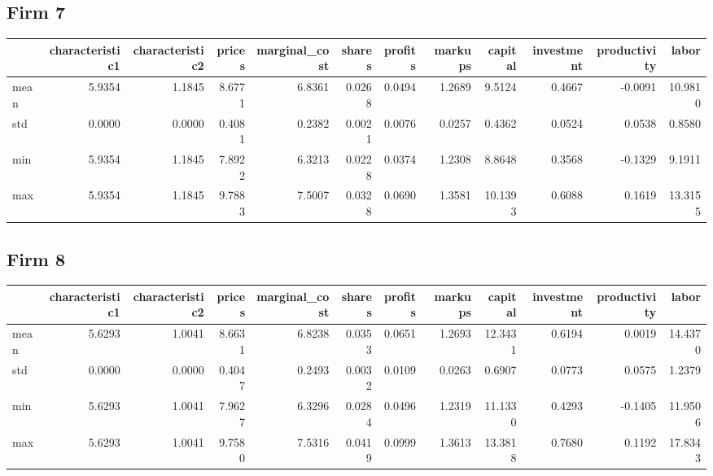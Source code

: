 \subsection*{Firm 7}
\begin{tabular}{lrrrrrrrrrrr}
\toprule
{} &  characteristic1 &  characteristic2 &  prices &  marginal\_cost &  shares &  profits &  markups &  capital &  investment &  productivity &   labor \\
\midrule
mean &           5.9354 &           1.1845 &  8.6771 &         6.8361 &  0.0268 &   0.0494 &   1.2689 &   9.5124 &      0.4667 &       -0.0091 & 10.9810 \\
std  &           0.0000 &           0.0000 &  0.4081 &         0.2382 &  0.0021 &   0.0076 &   0.0257 &   0.4362 &      0.0524 &        0.0538 &  0.8580 \\
min  &           5.9354 &           1.1845 &  7.8922 &         6.3213 &  0.0228 &   0.0374 &   1.2308 &   8.8648 &      0.3568 &       -0.1329 &  9.1911 \\
max  &           5.9354 &           1.1845 &  9.7883 &         7.5007 &  0.0328 &   0.0690 &   1.3581 &  10.1393 &      0.6088 &        0.1619 & 13.3155 \\
\bottomrule
\end{tabular}


\subsection*{Firm 8}
\begin{tabular}{lrrrrrrrrrrr}
\toprule
{} &  characteristic1 &  characteristic2 &  prices &  marginal\_cost &  shares &  profits &  markups &  capital &  investment &  productivity &   labor \\
\midrule
mean &           5.6293 &           1.0041 &  8.6631 &         6.8238 &  0.0353 &   0.0651 &   1.2693 &  12.3431 &      0.6194 &        0.0019 & 14.4370 \\
std  &           0.0000 &           0.0000 &  0.4047 &         0.2493 &  0.0032 &   0.0109 &   0.0263 &   0.6907 &      0.0773 &        0.0575 &  1.2379 \\
min  &           5.6293 &           1.0041 &  7.9627 &         6.3296 &  0.0284 &   0.0496 &   1.2319 &  11.1330 &      0.4293 &       -0.1405 & 11.9506 \\
max  &           5.6293 &           1.0041 &  9.7580 &         7.5316 &  0.0419 &   0.0999 &   1.3613 &  13.3818 &      0.7680 &        0.1192 & 17.8343 \\
\bottomrule
\end{tabular}


